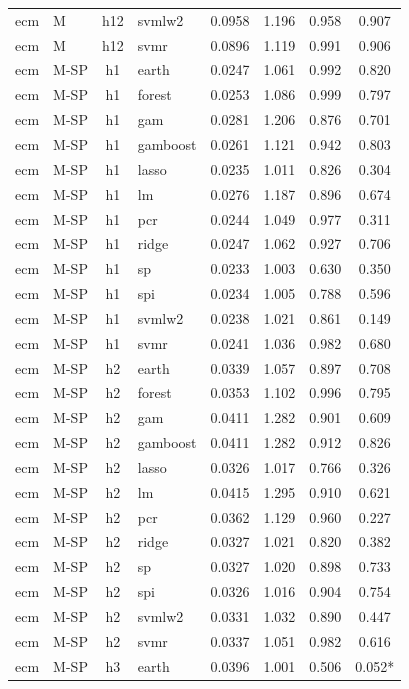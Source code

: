 \begin{ThreePartTable}
\begin{longtable}[t]{llclcccc}
ecm & M & h12 & svmlw2 & 0.0958 & 1.196 & 0.958 & 0.907\\
ecm & M & h12 & svmr & 0.0896 & 1.119 & 0.991 & 0.906\\
\addlinespace
ecm & M-SP & h1 & earth & 0.0247 & 1.061 & 0.992 & 0.820\\
ecm & M-SP & h1 & forest & 0.0253 & 1.086 & 0.999 & 0.797\\
ecm & M-SP & h1 & gam & 0.0281 & 1.206 & 0.876 & 0.701\\
ecm & M-SP & h1 & gamboost & 0.0261 & 1.121 & 0.942 & 0.803\\
ecm & M-SP & h1 & lasso & 0.0235 & 1.011 & 0.826 & 0.304\\
ecm & M-SP & h1 & lm & 0.0276 & 1.187 & 0.896 & 0.674\\
ecm & M-SP & h1 & pcr & 0.0244 & 1.049 & 0.977 & 0.311\\
ecm & M-SP & h1 & ridge & 0.0247 & 1.062 & 0.927 & 0.706\\
ecm & M-SP & h1 & sp & 0.0233 & 1.003 & 0.630 & 0.350\\
ecm & M-SP & h1 & spi & 0.0234 & 1.005 & 0.788 & 0.596\\
ecm & M-SP & h1 & svmlw2 & 0.0238 & 1.021 & 0.861 & 0.149\\
ecm & M-SP & h1 & svmr & 0.0241 & 1.036 & 0.982 & 0.680\\
\addlinespace
ecm & M-SP & h2 & earth & 0.0339 & 1.057 & 0.897 & 0.708\\
ecm & M-SP & h2 & forest & 0.0353 & 1.102 & 0.996 & 0.795\\
ecm & M-SP & h2 & gam & 0.0411 & 1.282 & 0.901 & 0.609\\
ecm & M-SP & h2 & gamboost & 0.0411 & 1.282 & 0.912 & 0.826\\
ecm & M-SP & h2 & lasso & 0.0326 & 1.017 & 0.766 & 0.326\\
ecm & M-SP & h2 & lm & 0.0415 & 1.295 & 0.910 & 0.621\\
ecm & M-SP & h2 & pcr & 0.0362 & 1.129 & 0.960 & 0.227\\
ecm & M-SP & h2 & ridge & 0.0327 & 1.021 & 0.820 & 0.382\\
ecm & M-SP & h2 & sp & 0.0327 & 1.020 & 0.898 & 0.733\\
ecm & M-SP & h2 & spi & 0.0326 & 1.016 & 0.904 & 0.754\\
ecm & M-SP & h2 & svmlw2 & 0.0331 & 1.032 & 0.890 & 0.447\\
ecm & M-SP & h2 & svmr & 0.0337 & 1.051 & 0.982 & 0.616\\
\addlinespace
ecm & M-SP & h3 & earth & 0.0396 & 1.001 & 0.506 & 0.052*\\

\end{longtable}
\end{ThreePartTable}
